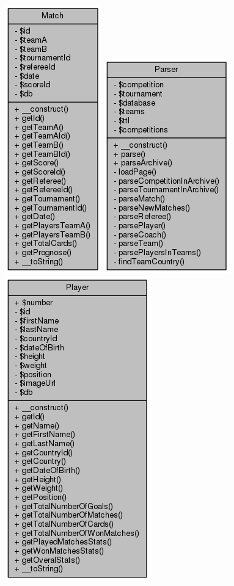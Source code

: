 \documentclass[11pt]{article}
\begin{document}
\includegraphics[scale=0.4]{UML_Match.png}
\includegraphics[scale=0.4]{UML_Parser.png}
\includegraphics[scale=0.4]{UML_Player.png}
\end{document}
